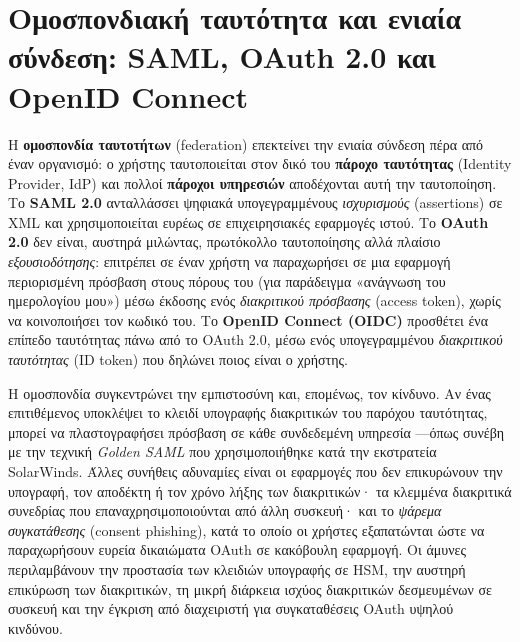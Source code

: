 \section{Ομοσπονδιακή ταυτότητα και ενιαία σύνδεση: SAML, OAuth 2.0 και OpenID Connect}\label{sec:8.6}
Η \textbf{ομοσπονδία ταυτοτήτων} (federation) επεκτείνει την ενιαία σύνδεση πέρα από έναν οργανισμό: ο χρήστης ταυτοποιείται στον δικό του \textbf{πάροχο ταυτότητας} (Identity Provider, IdP) και πολλοί \textbf{πάροχοι υπηρεσιών} αποδέχονται αυτή την ταυτοποίηση. Το \textbf{SAML 2.0} ανταλλάσσει ψηφιακά υπογεγραμμένους \emph{ισχυρισμούς} (assertions) σε XML και χρησιμοποιείται ευρέως σε επιχειρησιακές εφαρμογές ιστού. Το \textbf{OAuth 2.0} δεν είναι, αυστηρά μιλώντας, πρωτόκολλο ταυτοποίησης αλλά πλαίσιο \emph{εξουσιοδότησης}: επιτρέπει σε έναν χρήστη να παραχωρήσει σε μια εφαρμογή περιορισμένη πρόσβαση στους πόρους του (για παράδειγμα «ανάγνωση του ημερολογίου μου») μέσω έκδοσης ενός \emph{διακριτικού πρόσβασης} (access token), χωρίς να κοινοποιήσει τον κωδικό του. Το \textbf{OpenID Connect (OIDC)} προσθέτει ένα επίπεδο ταυτότητας πάνω από το OAuth 2.0, μέσω ενός υπογεγραμμένου \emph{διακριτικού ταυτότητας} (ID token) που δηλώνει ποιος είναι ο χρήστης.

Η ομοσπονδία συγκεντρώνει την εμπιστοσύνη και, επομένως, τον κίνδυνο. Αν ένας επιτιθέμενος υποκλέψει το κλειδί υπογραφής διακριτικών του παρόχου ταυτότητας, μπορεί να πλαστογραφήσει πρόσβαση σε κάθε συνδεδεμένη υπηρεσία —όπως συνέβη με την τεχνική \emph{Golden SAML} που χρησιμοποιήθηκε κατά την εκστρατεία SolarWinds. Άλλες συνήθεις αδυναμίες είναι οι εφαρμογές που δεν επικυρώνουν την υπογραφή, τον αποδέκτη ή τον χρόνο λήξης των διακριτικών· τα κλεμμένα διακριτικά συνεδρίας που επαναχρησιμοποιούνται από άλλη συσκευή· και το \emph{ψάρεμα συγκατάθεσης} (consent phishing), κατά το οποίο οι χρήστες εξαπατώνται ώστε να παραχωρήσουν ευρεία δικαιώματα OAuth σε κακόβουλη εφαρμογή. Οι άμυνες περιλαμβάνουν την προστασία των κλειδιών υπογραφής σε HSM, την αυστηρή επικύρωση των διακριτικών, τη μικρή διάρκεια ισχύος διακριτικών δεσμευμένων σε συσκευή και την έγκριση από διαχειριστή για συγκαταθέσεις OAuth υψηλού κινδύνου.

